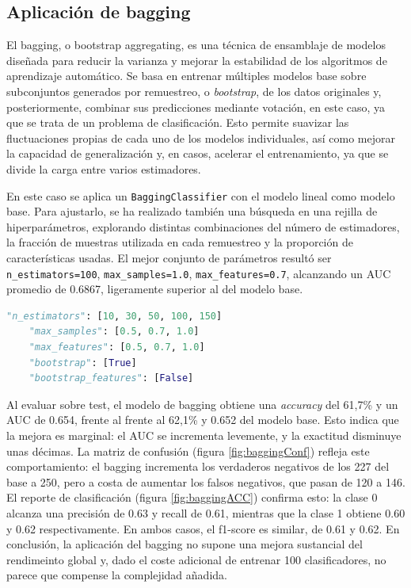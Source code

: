 \documentclass[a4paper,onecolumn]{extarticle}
\begin{document}
\begin{sloppypar}
\subsection{Aplicación de bagging}\label{bagging}
El bagging, o bootstrap aggregating, es una técnica de ensamblaje de modelos diseñada para reducir la varianza y mejorar la estabilidad de los algoritmos de aprendizaje 
automático. Se basa en entrenar múltiples modelos base sobre subconjuntos generados por remuestreo, o \textit{bootstrap}, de los datos originales y, posteriormente, 
combinar sus predicciones mediante votación, en este caso, ya que se trata de un problema de clasificación. Esto permite suavizar las fluctuaciones propias de cada uno de 
los modelos individuales, así como mejorar la capacidad de generalización y, en casos, acelerar el entrenamiento, ya que se divide la carga entre varios estimadores.

En este caso se aplica un \texttt{BaggingClassifier} con el modelo lineal como modelo base. Para ajustarlo, se ha realizado también una búsqueda en una rejilla de hiperparámetros,
explorando distintas combinaciones del número de estimadores, la fracción de muestras utilizada en cada remuestreo y la proporción de características usadas. El mejor conjunto 
de parámetros resultó ser \texttt{n\_estimators=100}, \texttt{max\_samples=1.0}, \texttt{max\_features=0.7}, alcanzando un AUC promedio de 0.6867, ligeramente superior al 
del modelo base.
\begin{lstlisting}[language=Python,]
    "n_estimators": [10, 30, 50, 100, 150]
    "max_samples": [0.5, 0.7, 1.0]
    "max_features": [0.5, 0.7, 1.0]
    "bootstrap": [True]
    "bootstrap_features": [False]
\end{lstlisting}

Al evaluar sobre test, el modelo de bagging obtiene una \textit{accuracy} del 61,7\% y un AUC de 0.654, frente al frente al 62,1\%  y 0.652 del modelo base. Esto indica que 
la mejora es marginal: el AUC se incrementa levemente, y la exactitud disminuye unas décimas. La matriz de confusión (figura \ref{fig:baggingConf}) refleja este comportamiento:
el bagging incrementa los verdaderos negativos de los 227 del base a 250, pero a costa de aumentar los falsos negativos, que pasan de 120 a 146. El reporte de clasificación 
(figura \ref{fig:baggingACC}) confirma esto: la clase 0 alcanza una precisión de 0.63 y recall de 0.61, mientras que la clase 1 obtiene 0.60 y 0.62 respectivamente. En ambos 
casos, el f1-score es similar, de 0.61 y 0.62. En conclusión, la aplicación del bagging no supone una mejora sustancial del rendimeinto global y, dado el coste adicional de
entrenar 100 clasificadores, no parece que compense la complejidad añadida.


\end{sloppypar}
\end{document}
